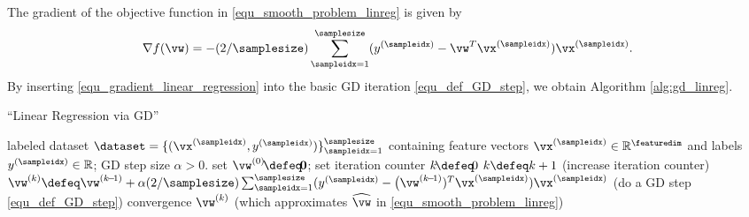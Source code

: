 \documentclass[12pt]{report}
\begin{document}
The gradient of the objective function in \eqref{equ_smooth_problem_linreg} is given by 
\begin{equation}
\label{equ_gradient_linear_regression}
\nabla f(\vw) = -(2/\samplesize) \sum_{\sampleidx=1}^{\samplesize} (y^{(\sampleidx)} - \vw^{T} \vx^{(\sampleidx)}) \vx^{(\sampleidx)}.
\end{equation} 
By inserting \eqref{equ_gradient_linear_regression} into the basic GD iteration \eqref{equ_def_GD_step}, we obtain Algorithm \ref{alg:gd_linreg}. 
\begin{algorithm}[htbp]
\caption{``Linear Regression via GD''}\label{alg:gd_linreg}
\begin{algorithmic}[1]
\renewcommand{\algorithmicrequire}{\textbf{Input:}}
\renewcommand{\algorithmicensure}{\textbf{Output:}}
\Require   labeled dataset $\dataset=\{ (\vx^{(\sampleidx)}, y^{(\sampleidx)}) \}_{\sampleidx=1}^{\samplesize}$ containing feature vectors 
$\vx^{(\sampleidx)} \in \mathbb{R}^{\featuredim}$ and labels $y^{(\sampleidx)} \in \mathbb{R}$; GD step size $\alpha >0$. 
\Statex\hspace{-6mm}{\bf Initialize:} set $\vw^{(0)}\!\defeq\!\mathbf{0}$; set iteration counter $k\!\defeq\!0$   
\Repeat 
\State $k \defeq k +1$    (increase iteration counter) 
\State  $\vw^{(k)} \defeq \vw^{(k\!-\!1)} + \alpha (2/\samplesize) \sum_{\sampleidx=1}^{\samplesize} (y^{(\sampleidx)} - \big(\vw^{(k\!-\!1)})^{T} \vx^{(\sampleidx)}) \vx^{(\sampleidx)}$  (do a GD step \eqref{equ_def_GD_step})
\Until convergence 
\Ensure $\vw^{(k)}$ (which approximates $\widehat{\vw}$ in \eqref{equ_smooth_problem_linreg})
\end{algorithmic}
\end{algorithm}
\end{document}
